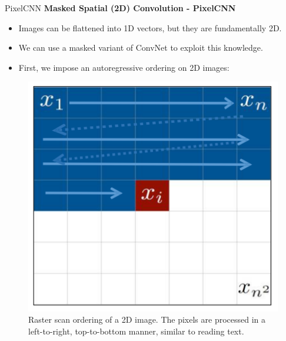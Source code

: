 \begin{frame}[allowframebreaks]{PixelCNN}
\textbf{Masked Spatial (2D) Convolution - PixelCNN}
\begin{itemize}
    \item Images can be flattened into 1D vectors, but they are fundamentally 2D.
    \item We can use a masked variant of ConvNet to exploit this knowledge.
    \item First, we impose an autoregressive ordering on 2D images:
\end{itemize}

\begin{figure}
    \centering
    \includegraphics[height=0.4\textheight, width=\textwidth,keepaspectratio]{images/autoregressive/raster-scan.png}
    \caption*{Raster scan ordering of a 2D image. The pixels are processed in a left-to-right, top-to-bottom manner, similar to reading text.}
\end{figure}


\end{frame}
